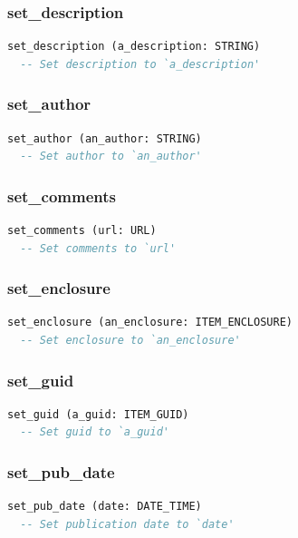 \subsubsection{set\_description}

\begin{lstlisting}[language=Eiffel]
set_description (a_description: STRING)
  -- Set description to `a_description'
\end{lstlisting}

\subsubsection{set\_author}

\begin{lstlisting}[language=Eiffel]
set_author (an_author: STRING)
  -- Set author to `an_author'
\end{lstlisting}

\subsubsection{set\_comments}

\begin{lstlisting}[language=Eiffel]
set_comments (url: URL)
  -- Set comments to `url'
\end{lstlisting}

\subsubsection{set\_enclosure}

\begin{lstlisting}[language=Eiffel]
set_enclosure (an_enclosure: ITEM_ENCLOSURE)
  -- Set enclosure to `an_enclosure'
\end{lstlisting}

\subsubsection{set\_guid}

\begin{lstlisting}[language=Eiffel]
set_guid (a_guid: ITEM_GUID)
  -- Set guid to `a_guid'
\end{lstlisting}

\subsubsection{set\_pub\_date}

\begin{lstlisting}[language=Eiffel]
set_pub_date (date: DATE_TIME)
  -- Set publication date to `date'
\end{lstlisting}

